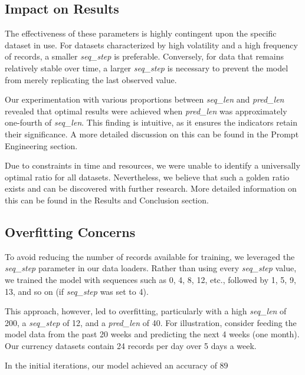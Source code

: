 \subsection{Impact on Results}
The effectiveness of these parameters is highly contingent upon the specific dataset in use. For datasets characterized by high volatility and a high frequency of records, a smaller \textit{seq\_step} is preferable. Conversely, for data that remains relatively stable over time, a larger \textit{seq\_step} is necessary to prevent the model from merely replicating the last observed value.

Our experimentation with various proportions between \textit{seq\_len} and \textit{pred\_len} revealed that optimal results were achieved when \textit{pred\_len} was approximately one-fourth of \textit{seq\_len}. This finding is intuitive, as it ensures the indicators retain their significance. A more detailed discussion on this can be found in the Prompt Engineering section.

Due to constraints in time and resources, we were unable to identify a universally optimal ratio for all datasets. Nevertheless, we believe that such a golden ratio exists and can be discovered with further research. More detailed information on this can be found in the Results and Conclusion section.

\subsection{Overfitting Concerns}
To avoid reducing the number of records available for training, we leveraged the \textit{seq\_step} parameter in our data loaders. Rather than using every \textit{seq\_step} value, we trained the model with sequences such as 0, 4, 8, 12, etc., followed by 1, 5, 9, 13, and so on (if \textit{seq\_step} was set to 4).

This approach, however, led to overfitting, particularly with a high \textit{seq\_len} of 200, a \textit{seq\_step} of 12, and a \textit{pred\_len} of 40. For illustration, consider feeding the model data from the past 20 weeks and predicting the next 4 weeks (one month). Our currency datasets contain 24 records per day over 5 days a week.

In the initial iterations, our model achieved an accuracy of 89%

